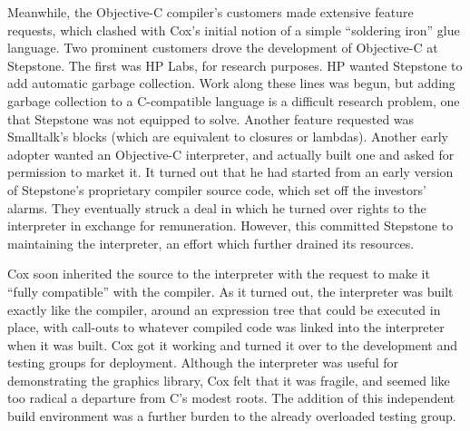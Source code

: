 \documentclass[acmsmall]{acmart}\settopmatter{}
\begin{document}
Meanwhile, the Objective-C compiler's customers made extensive feature requests, which clashed with Cox's initial notion of a simple ``soldering iron'' glue language. Two prominent customers drove the development of Objective-C at Stepstone. The first was HP Labs, for research purposes. HP wanted Stepstone to add automatic garbage collection. Work along these lines was begun, but adding garbage collection to a C-compatible language is a difficult research problem, one that Stepstone was not equipped to solve. Another feature requested was Smalltalk's blocks (which are equivalent to closures or lambdas). Another early adopter wanted an Objective-C interpreter, and actually built one and asked for permission to market it. It turned out that he had started from an early version of Stepstone's proprietary compiler source code, which set off the investors' alarms. They eventually struck a deal in which he turned over rights to the interpreter in exchange for remuneration. However, this committed Stepstone to maintaining the interpreter, an effort which further drained its resources.

Cox soon inherited the source to the interpreter with the request to make it ``fully compatible'' with the compiler. As it turned out, the interpreter was built exactly like the compiler, around an expression tree that could be executed in place, with call-outs to whatever compiled code was linked into the interpreter when it was built. Cox got it working and turned it over to the development and testing groups for deployment. Although the interpreter was useful for demonstrating the graphics library, Cox felt that it was fragile, and seemed like too radical a departure from C's modest roots. The addition of this independent build environment was a further burden to the already overloaded testing group. 
\end{document}
